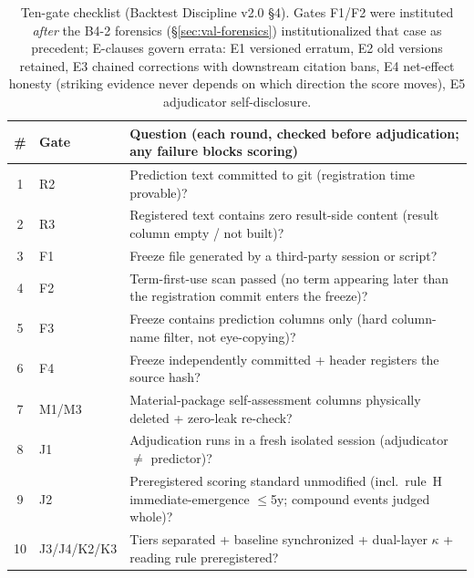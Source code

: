 
\begin{table}[h]
\centering
\begin{tabular}{clp{}}
\toprule
\textbf{\#} & \textbf{Gate} & \textbf{Question (each round, checked
before adjudication; any failure blocks scoring)} \\
\midrule
1 & R2 & Prediction text committed to git (registration time
provable)? \\
2 & R3 & Registered text contains zero result-side content (result
column empty / not built)? \\
3 & F1 & Freeze file generated by a third-party session or script? \\
4 & F2 & Term-first-use scan passed (no term appearing later than
the registration commit enters the freeze)? \\
5 & F3 & Freeze contains prediction columns only (hard column-name
filter, not eye-copying)? \\
6 & F4 & Freeze independently committed + header registers the
source hash? \\
7 & M1/M3 & Material-package self-assessment columns physically
deleted + zero-leak re-check? \\
8 & J1 & Adjudication runs in a fresh isolated session (adjudicator
$\neq$ predictor)? \\
9 & J2 & Preregistered scoring standard unmodified (incl.\ rule~H
immediate-emergence $\le$5y; compound events judged whole)? \\
10 & J3/J4/K2/K3 & Tiers separated + baseline synchronized +
dual-layer $\kappa$ + reading rule preregistered? \\
\bottomrule
\end{tabular}
\caption{Ten-gate checklist (Backtest Discipline v2.0 \S4). Gates
F1/F2 were instituted \emph{after} the B4-2 forensics
(\S\ref{sec:val-forensics}) institutionalized that case as
precedent; E-clauses govern errata: E1 versioned erratum, E2 old
versions retained, E3 chained corrections with downstream citation
bans, E4 net-effect honesty (striking evidence never depends on
which direction the score moves), E5 adjudicator self-disclosure.}
\label{tab:ten-gates}
\end{table}
